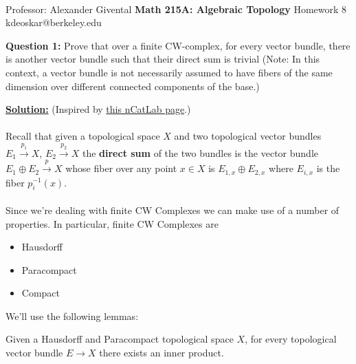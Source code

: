 \documentclass[11pt]{article}
\begin{document}
\thispagestyle{empty}
\bigskip \
\vspace{0.1cm}

\begin{center}
{\fontsize{22}{22} \selectfont Professor: Alexander Givental}
\vskip 16pt
{\fontsize{30}{30} \selectfont \bf \sffamily Math 215A: Algebraic Topology}
\vskip 24pt
{\fontsize{14}{14} \selectfont \rmfamily Homework 8} 
\vskip 6pt
{\fontsize{14}{14} \selectfont \ttfamily kdeoskar@berkeley.edu} 
\vskip 24pt
\end{center}




\begin{bluebox}
  \textbf{Question 1:} Prove that over a finite CW-complex, for every vector bundle, there is another vector bundle such that their direct sum is trivial (Note: In this context, a vector bundle is not necessarily assumed to have fibers of the same dimension over different connected components of the base.)
\end{bluebox}

\vskip 0.5cm
\textbf{\underline{Solution:}} (Inspired by \href{https://ncatlab.org/nlab/show/direct+sum+of+vector+bundles#whitney_summands_of_trivial_vector_bundles}{this nCatLab page}.)
\\
\\
Recall that given a topological space $X$ and two topological vector bundles $E_1 \xrightarrow{p_1} X$, $E_2 \xrightarrow{p_2} X$ the \textbf{direct sum} of the two bundles is the vector bundle $E_1 \oplus E_2 \xrightarrow{p} X$ whose fiber over any point $x \in X$ is $E_{1, x} \oplus E_{2, x}$ where $E_{i, x}$ is the fiber $p^{-1}_i(x)$.
\\
\\
Since we're dealing with finite CW Complexes we can make use of a number of properties. In particular, finite CW Complexes are 
\begin{itemize}
  \item Hausdorff
  \item Paracompact
  \item Compact
\end{itemize}

We'll use the following lemmas:

\begin{redbox}
  \begin{lemma}
    Given a Hausdorff and Paracompact topological space $X$, for every topological vector bundle $E \rightarrow X$ there exists an inner product.
  \end{lemma}
\end{redbox}
\end{document}
